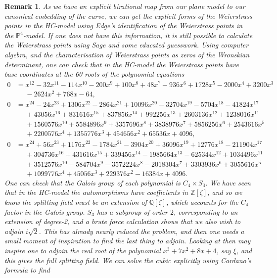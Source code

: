 \documentclass{amsart}
\newtheorem{remark}[theorem]{Remark}
\begin{document}
\begin{remark}
As we have an explicit birational map from our plane model to our canonical embedding of the curve, we can get the explicit forms of the Weierstrass points in the HC-model using Edge's identification of the Weierstrass points in the $\mathbb{P}^4$-model. If one does not have this information, it is still possible to calculate the Weierstrass points using Sage and some educated guesswork. Using computer algebra, and the characterisation of Weierstrass points as zeros of the Wronskian determinant, one can check that in the HC-model the Weierstrass points have base coordinates at the 60 roots of the polynomial equations  
\begin{align*}
    0 &= x^{12} - 32x^{11} - 114x^{10} - 200x^9 + 100x^8 + 48x^7 - 936x^6 + 1728x^5 - 2000x^4 + 3200x^3 \\
    &\phantom{=} - 2624x^2 + 768x - 64  , \\
    0 &= x^{24} - 24x^{23} + 1306x^{22} - 2864x^{21} + 10096x^{20} - 32704x^{19} - 5704x^{18} - 41824x^{17}  \\
    &\phantom{=} + 43056x^{16} + 831616x^{15} + 837856x^{14} + 992256x^{13} + 2603136x^{12} + 1238016x^{11}  \\
    &\phantom{=} + 1560576x^{10} + 5584896x^9 + 3357696x^8 + 3838976x^7 + 5856256x^6 + 2543616x^5  \\
    &\phantom{=} + 2200576x^4 + 1355776x^3 + 454656x^2 + 65536x + 4096  , \\
    0 &= x^{24} + 56x^{23} + 1176x^{22} - 1784x^{21} - 3904x^{20} + 36096x^{19} + 12776x^{18} - 211904x^{17}  \\
    &\phantom{=} + 304736x^{16} + 431616x^{15} + 339456x^{14} - 1985664x^{13} - 625344x^{12} + 1034496x^{11}  \\
    &\phantom{=} + 3512576x^{10} - 584704x^9 - 3572224x^8 - 2018304x^7 + 3303936x^6 + 3055616x^5  \\ 
    &\phantom{=} + 1099776x^4 + 45056x^3 + 229376x^2 - 16384x + 4096  .
\end{align*}
One can check that the Galois group of each polynomial is $C_4 \times S_3$. We have seen that in the HC-model the automorphisms have coefficients in $\mathbb{Z}[\zeta]$, and so we know the splitting field must be an extension of $\mathbb{Q}[\zeta]$, which accounts for the $C_4$ factor in the Galois group. $S_3$ has a subgroup of order $2$, corresponding to an extension of degree-2, and a brute force calculation shows that we also wish to adjoin $i\sqrt{2}$. This has already nearly reduced the problem, and then one needs a small moment of inspiration to find the last thing to adjoin. Looking at \cite{Riera1992} then may inspire one to adjoin the real root of the polynomial $x^3+7x^2+8x+4$, say $\xi$, and this gives the full splitting field. We can solve the cubic explicitly using Cardano's formula to find 

\end{remark}
\end{document}
